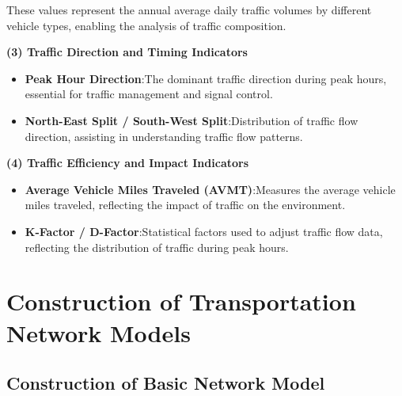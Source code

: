 \documentclass{mcmthesis}
\begin{document}
These values represent the annual average daily traffic volumes by different vehicle types, enabling the analysis of traffic composition.

\textbf{(3) Traffic Direction and Timing Indicators}

\begin{itemize}
    \item \textbf{Peak Hour Direction}:The dominant traffic direction during peak hours, essential for traffic management and signal control.  

    \item \textbf{North-East Split / South-West Split}:Distribution of traffic flow direction, assisting in understanding traffic flow patterns.
\end{itemize}

\textbf{(4) Traffic Efficiency and Impact Indicators}

\begin{itemize}
    \item \textbf{Average Vehicle Miles Traveled (AVMT)}:Measures the average vehicle miles traveled, reflecting the impact of traffic on the environment.    

    \item \textbf{K-Factor / D-Factor}:Statistical factors used to adjust traffic flow data, reflecting the distribution of traffic during peak hours.
\end{itemize}



\section{Construction of Transportation Network Models}

\subsection{Construction of Basic Network Model}
\end{document}
